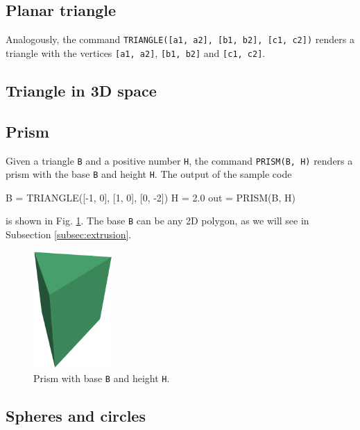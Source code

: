 \subsection{Planar triangle}

Analogously, the command {\tt TRIANGLE([a1, a2], [b1, b2], [c1, c2])} renders 
a triangle with the vertices {\tt [a1, a2]}, {\tt [b1, b2]} and {\tt [c1, c2]}. 

\subsection{Triangle in 3D space}


\subsection{Prism}\label{subsec:prism}

Given a triangle {\tt B} and a positive number {\tt H}, the command 
{\tt PRISM(B, H)} renders a prism with the base {\tt B} and height {\tt H}. 
The output of the sample code

\begin{bluecode}
B = TRIANGLE([-1, 0], [1, 0], [0, -2])
H = 2.0
out = PRISM(B, H)
\end{bluecode}
is shown in Fig. \ref{fig:prism}. The base {\tt B} can be any 2D polygon,
as we will see in Subsection \ref{subsec:extrusion}.\\

\begin{figure}[!ht]
\begin{center}
\includegraphics[width=0.27\textwidth]{img/prism-0.png}
\end{center}
\vspace{-4mm}
\caption{Prism with base {\tt B} and height {\tt H}.}
\label{fig:prism}
\vspace{-1cm}
\end{figure}


\subsection{Spheres and circles}

